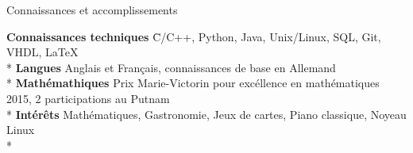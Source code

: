 \documentclass{article}
\newlength{\tabin}
\newlength{\secsep}
\newcommand{\lineunder}{\vspace*{-8pt} \\ \hspace*{-6pt} \hrulefill \\ \vspace*{-15pt}}
\newenvironment{tabbedsection}[1]{
  \begin{list}{}{
      \setlength{\itemsep}{0pt}
      \setlength{\labelsep}{0pt}
      \setlength{\labelwidth}{0pt}
      \setlength{\leftmargin}{\tabin}
      \setlength{\rightmargin}{\tabin}
      \setlength{\listparindent}{0pt}
      \setlength{\parsep}{0pt}
      \setlength{\parskip}{0pt}
      \setlength{\partopsep}{0pt}
      \setlength{\topsep}{#1}
    }
  \item[]
}{\end{list}}
\newenvironment{nospacetabbing}{
    \begin{tabbing}
}{\end{tabbing}\vspace{-1.2em}}
\newenvironment{resume_section}[1]{
  \filbreak
  \vspace{2\secsep}
  \textsc{\large#1}
  \lineunder
  \begin{tabbedsection}{\secsep}
}{\end{tabbedsection}}
\begin{document}
\begin{resume_section}{Connaissances et accomplissements}
  \begin{nospacetabbing}

  \textbf{Connaissances techniques}  \= C/C++, Python, Java, Unix/Linux, SQL, Git, VHDL, \LaTeX\\*
  \textbf{Langues} \> Anglais et Français, connaissances de base en Allemand\\*
  \textbf{Mathémathiques} \> Prix Marie-Victorin pour excéllence en mathématiques 2015, 2 participations au Putnam\\*
  \textbf{Intérêts} \> Mathématiques, Gastronomie, Jeux de cartes, Piano classique, Noyeau Linux\\*
  \end{nospacetabbing}
\end{resume_section}
\end{document}
